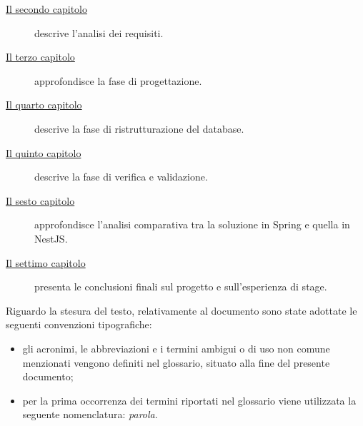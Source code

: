 \begin{description}
    \item[{\hyperref[cap:analisi-requisiti]{Il secondo capitolo}}] descrive l'analisi dei requisiti.
    
    \item[{\hyperref[cap:progettazione]{Il terzo capitolo}}] approfondisce la fase di progettazione.
    
    \item[{\hyperref[cap:ristrutturazione-database]{Il quarto capitolo}}] descrive la fase di ristrutturazione del database.
    
    \item[{\hyperref[cap:verifica-e-validazione]{Il quinto capitolo}}] descrive la fase di verifica e validazione.
    
    \item[{\hyperref[cap:analisi-comparativa]{Il sesto capitolo}}] approfondisce l'analisi comparativa tra la soluzione in Spring e quella in NestJS.
    
    \item[{\hyperref[cap:conclusioni]{Il settimo capitolo}}] presenta le conclusioni finali sul progetto e sull'esperienza di stage.
\end{description}

Riguardo la stesura del testo, relativamente al documento sono state adottate le seguenti convenzioni tipografiche:
\begin{itemize}
	\item gli acronimi, le abbreviazioni e i termini ambigui o di uso non comune menzionati vengono definiti nel glossario, situato alla fine del presente documento;
	\item per la prima occorrenza dei termini riportati nel glossario viene utilizzata la seguente nomenclatura: \emph{parola}\glsfirstoccur.
\end{itemize}